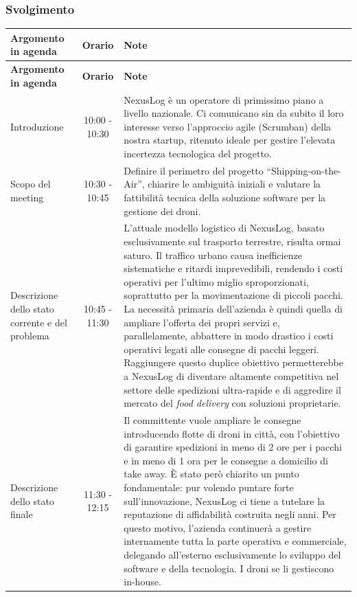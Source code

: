 \documentclass[12pt, a4paper]{article}
\begin{document}
\subsubsection*{Svolgimento}
\renewcommand{\arraystretch}{1.5}
\begin{longtable}{|>{\raggedright\arraybackslash}p{}|c|>{\raggedright\arraybackslash}p{}|}
\hline
\textbf{Argomento in agenda} & \textbf{Orario} & \textbf{Note} \\
\hline
\endfirsthead

\hline
\textbf{Argomento in agenda} & \textbf{Orario}  & \textbf{Note} \\
\hline
\endhead

\hline
\endfoot

\hline
\endlastfoot

Introduzione & 10:00 - 10:30 & NexusLog è un operatore di primissimo piano a livello nazionale. Ci comunicano sin da subito il loro interesse verso l'approccio agile (Scrumban) della nostra startup, ritenuto ideale per gestire l'elevata incertezza tecnologica del progetto. \\
\hline
Scopo del meeting & 10:30 - 10:45 & Definire il perimetro del progetto ``Shipping-on-the-Air'', chiarire le ambiguità iniziali e valutare la fattibilità tecnica della soluzione software per la gestione dei droni. \\
\hline
Descrizione dello stato corrente e del problema & 10:45 - 11:30 & L'attuale modello logistico di NexusLog, basato esclusivamente sul trasporto terrestre, risulta ormai saturo. Il traffico urbano causa inefficienze sistematiche e ritardi imprevedibili, rendendo i costi operativi per l'ultimo miglio sproporzionati, soprattutto per la movimentazione di piccoli pacchi. \vspace{0.5em} \newline La necessità primaria dell'azienda è quindi quella di ampliare l'offerta dei propri servizi e, parallelamente, abbattere in modo drastico i costi operativi legati alle consegne di pacchi leggeri. Raggiungere questo duplice obiettivo permetterebbe a NexusLog di diventare altamente competitiva nel settore delle spedizioni ultra-rapide e di aggredire il mercato del \textit{food delivery} con soluzioni proprietarie. \\
\hline
Descrizione dello stato finale & 11:30 - 12:15 & Il committente vuole ampliare le consegne introducendo flotte di droni in città, con l'obiettivo di garantire spedizioni in meno di 2 ore per i pacchi e in meno di 1 ora per le consegne a domicilio di take away. \vspace{0.5em} \newline È stato però chiarito un punto fondamentale: pur volendo puntare forte sull'innovazione, NexusLog ci tiene a tutelare la reputazione di affidabilità costruita negli anni. Per questo motivo, l'azienda continuerà a gestire internamente tutta la parte operativa e commerciale, delegando all'esterno esclusivamente lo sviluppo del software e della tecnologia. I droni se li gestiscono in-house. \\

\end{longtable}
\end{document}
